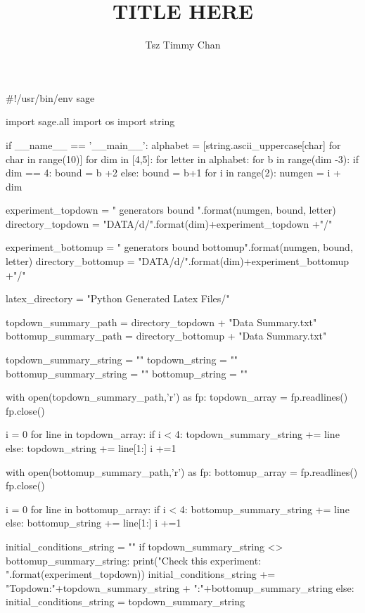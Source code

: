 \documentclass{TC}
\title{TITLE HERE}	%
\author{Tsz Timmy Chan}	%
\begin{document}
\begin{SAGE}
#!/usr/bin/env sage

import sage.all
import os
import string

if __name__ == '__main__':
	alphabet = [string.ascii_uppercase[char] for char in range(10)]
	for dim in [4,5]:
		for letter in alphabet:
			for b in range(dim -3):
				if dim == 4:
					bound = b +2
				else:
					bound = b+1
				for i in range(2):
					numgen = i + dim

					experiment_topdown = "{} generators {} bound {}".format(numgen, bound, letter)
					directory_topdown = "DATA/{}d/".format(dim)+experiment_topdown +"/"

					experiment_bottomup =  "{} generators {} bound {} bottomup".format(numgen, bound, letter)
					directory_bottomup = "DATA/{}d/".format(dim)+experiment_bottomup +"/"

					latex_directory = "Python Generated Latex Files/"

					topdown_summary_path = directory_topdown + "Data Summary.txt"
					bottomup_summary_path = directory_bottomup + "Data Summary.txt"

					topdown_summary_string = ""
					topdown_string = ""
					bottomup_summary_string = ""
					bottomup_string = ""

					with open(topdown_summary_path,'r') as fp:
						topdown_array = fp.readlines()
						fp.close()

					i = 0
					for line in topdown_array:
						if i < 4:
							topdown_summary_string += line
						else:
							topdown_string += line[1:]
						i +=1

					
					
					with open(bottomup_summary_path,'r') as fp:
						bottomup_array = fp.readlines()
						fp.close()
					
					i = 0
					for line in bottomup_array:
						if i < 4:
							bottomup_summary_string += line
						else:
							bottomup_string += line[1:]
						i +=1
					
					initial_conditions_string = ""
					if topdown_summary_string <> bottomup_summary_string:
						print("Check this experiment: {}".format(experiment_topdown))
						initial_conditions_string += "Topdown:\n"+topdown_summary_string + "\nBottomup:\n"+bottomup_summary_string
					else:
						initial_conditions_string = topdown_summary_string


\end{SAGE}
\end{document}
